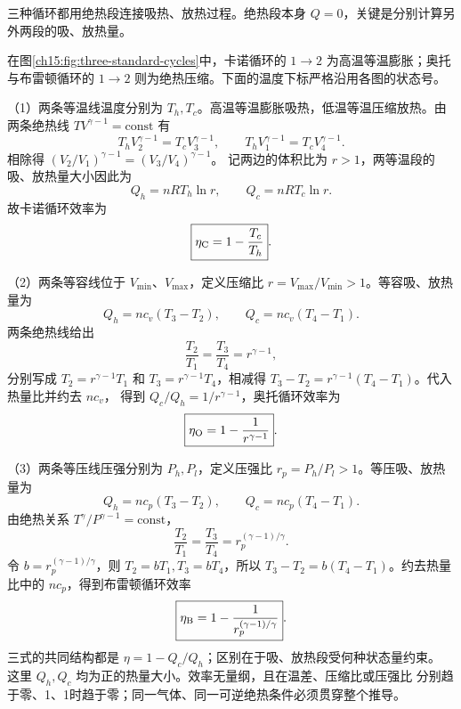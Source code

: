 {\begin{xesolution}
三种循环都用绝热段连接吸热、放热过程。绝热段本身 $Q=0$，关键是分别计算另外两段的吸、放热量。

在图\ref{ch15:fig:three-standard-cycles}中，卡诺循环的 $1\to2$ 为高温等温膨胀；奥托与布雷顿循环的
$1\to2$ 则为绝热压缩。下面的温度下标严格沿用各图的状态号。

（1）两条等温线温度分别为 $T_h,T_c$。高温等温膨胀吸热，低温等温压缩放热。由两条绝热线
$TV^{\gamma-1}=\mathrm{const}$ 有
\[
 T_hV_2^{\gamma-1}=T_cV_3^{\gamma-1},\qquad
 T_hV_1^{\gamma-1}=T_cV_4^{\gamma-1}.
\]
相除得 $(V_2/V_1)^{\gamma-1}=(V_3/V_4)^{\gamma-1}$。
记两边的体积比为 $r>1$，两等温段的吸、放热量大小因此为
\begin{equation*}
  Q_h=nRT_h\ln r,\qquad Q_c=nRT_c\ln r.
\end{equation*}
故卡诺循环效率为
\begin{equation}
  \boxed{\eta_{\rm C}=1-\frac{T_c}{T_h}}.
\end{equation}

（2）两条等容线位于 $V_{\min}$、$V_{\max}$，定义压缩比
$r=V_{\max}/V_{\min}>1$。等容吸、放热量为
\begin{equation*}
  Q_h=n c_v(T_3-T_2),\qquad Q_c=n c_v(T_4-T_1).
\end{equation*}
两条绝热线给出
\begin{equation*}
  \frac{T_2}{T_1}=\frac{T_3}{T_4}=r^{\gamma-1},
\end{equation*}
分别写成 $T_2=r^{\gamma-1}T_1$ 和 $T_3=r^{\gamma-1}T_4$，相减得
$T_3-T_2=r^{\gamma-1}(T_4-T_1)$。代入热量比并约去 $nc_v$，
得到 $Q_c/Q_h=1/r^{\gamma-1}$，奥托循环效率为
\begin{equation}
  \boxed{\eta_{\rm O}=1-\frac{1}{r^{\gamma-1}}}.
\end{equation}

（3）两条等压线压强分别为 $P_h,P_l$，定义压强比 $r_p=P_h/P_l>1$。等压吸、放热量为
\begin{equation*}
  Q_h=n c_p(T_3-T_2),\qquad Q_c=n c_p(T_4-T_1).
\end{equation*}
由绝热关系 $T^\gamma/P^{\gamma-1}=\mathrm{const}$，
\begin{equation*}
  \frac{T_2}{T_1}=\frac{T_3}{T_4}=r_p^{(\gamma-1)/\gamma}.
\end{equation*}
令 $b=r_p^{(\gamma-1)/\gamma}$，则 $T_2=bT_1,T_3=bT_4$，所以
$T_3-T_2=b(T_4-T_1)$。约去热量比中的 $nc_p$，得到布雷顿循环效率
\begin{equation}
  \boxed{\eta_{\rm B}=1-\frac{1}{r_p^{(\gamma-1)/\gamma}}}.
\end{equation}
三式的共同结构都是 $\eta=1-Q_c/Q_h$；区别在于吸、放热段受何种状态量约束。
这里 $Q_h,Q_c$ 均为正的热量大小。效率无量纲，且在温差、压缩比或压强比
分别趋于零、1、1时趋于零；同一气体、同一可逆绝热条件必须贯穿整个推导。
\end{xesolution}


}

